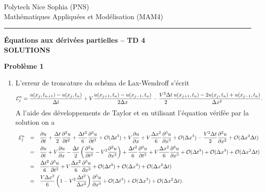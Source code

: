 \documentclass[12pt,a4paper]{article}
\begin{document}
 \hfill Polytech Nice Sophia (PNS)\\
\noindent Math\'ematiques Appliqu\'ees et Mod\'elisation (MAM4) \hfill \\
\hrule

\bigskip
\bigskip

\begin{center}{\bf \'Equations aux d\'eriv\'ees partielles --
TD 4 \\
SOLUTIONS}\end{center}

\bigskip

{\bf Probl\`eme 1}
\begin{enumerate}
\item L'erreur de troncature du sch\'ema de Lax-Wendroff s'\'ecrit
$$
{\cal E}^n_j=\frac{u(x_{j},t_{n+1})-u(x_j,t_n)}{\Delta
  t}+V\frac{u(x_{j+1},t_{n})-u(x_{j-1},t_n)}{2\Delta
  x}-\frac{V^2\Delta t}{2}\frac{u(x_{j+1},t_n)-2
  u(x_{j},t_n)+u(x_{j-1},t_n)}{\Delta x^2}.
$$
A l'aide des d\'eveloppements de Taylor et en utilisant l'\'equation
v\'erif\'ee par la solution on a
$$
\begin{array}{lcl}
{\cal E}^n_j &=&\displaystyle\frac{\partial u}{\partial t}+\frac{\Delta
  t}{2}\frac{\partial^2 u}{\partial t^2} + \frac{\Delta
  t^2}{6}\frac{\partial^3 u}{\partial t^3} + {\cal O} (\Delta t^3) + V \frac{\partial u}{\partial x}+V\frac{\Delta
  x^2}{6}\frac{\partial^3 u}{\partial x^3}+ {\cal O} (\Delta x^3) -\displaystyle \frac{V^2\Delta t}{2} \frac{\partial^2
  u}{\partial x^2} +  {\cal O} (\Delta x^2\Delta t)\\[2ex]
& = & \displaystyle \frac{\partial u}{\partial t}+V\frac{\partial
  u}{\partial x}-\frac{\Delta t}{2}\left(\frac{\partial^2 u}{\partial
    t^2}-V^2 \frac{\partial^2 u}{\partial x^2}\right)+ \frac{\Delta
  t^2}{6}\frac{\partial^3 u}{\partial t^3} + V\frac{\Delta
  x^2}{6}\frac{\partial^3 u}{\partial x^3} + {\cal O} (\Delta t^3) +{\cal O} (\Delta x^3) +  {\cal O} (\Delta x^2\Delta t) \\[2ex]
& = & \displaystyle\frac{\Delta
  t^2}{6}\frac{\partial^3 u}{\partial t^3} + V\frac{\Delta
  x^2}{6}\frac{\partial^3 u}{\partial x^3} + {\cal O} (\Delta t^3)
+{\cal O} (\Delta x^3) +  {\cal O} (\Delta x^2\Delta t) \\[2ex]
&=& \displaystyle\frac{V \Delta x^2}{6}\left(1-V^2\frac{\Delta t^2}{\Delta x^2}\right) \frac{\partial^3 u}{\partial x^3}+{\cal O} (\Delta t^3)
+{\cal O} (\Delta x^3) +  {\cal O} (\Delta x^2\Delta t).
\end{array} 
$$
\end{enumerate}
\end{document}
